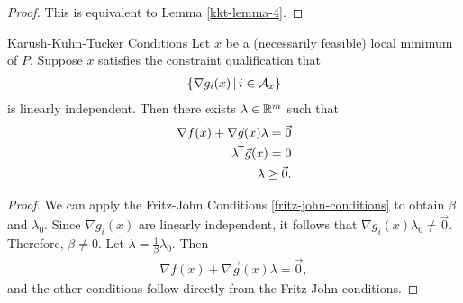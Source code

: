 \begin{proof}
    This is equivalent to Lemma \ref{kkt-lemma-4}.
\end{proof}

\begin{thm}{Karush-Kuhn-Tucker Conditions}\label{kkt-conditions}\proofbreak
    Let $x$ be a (necessarily feasible) local minimum of $P$. Suppose $x$ satisfies the constraint qualification that
    \begin{align}
        \left\{\nabla g_i(x) \,\middle|\, i \in \mathcal{A}_x\right\}
    \end{align}
    is linearly independent. Then there exists $\lambda \in \mathbb{R}^m$ such that
    \begin{align*}
        \nabla f(x) + \nabla \vec{g}(x)\lambda = \vec{0} \\
        {\lambda}^{\mkern-1.5mu\mathsf{T}}\vec{g}(x) = 0 \\
        \lambda \geq \vec{0}.
    \end{align*}
\end{thm}

\begin{proof}
    We can apply the Fritz-John Conditions \ref{fritz-john-conditions} to obtain $\beta$ and $\lambda_0$. Since $\nabla g_i(x)$ are linearly independent, it follows that $\nabla g_i(x)\lambda_0 \neq \vec{0}$. Therefore, $\beta \neq 0$. Let $\lambda = \frac{1}{\beta}\lambda_0$. Then
    \begin{align*}
        \nabla f(x) + \nabla \vec{g}(x)\lambda = \vec{0},
    \end{align*}
    and the other conditions follow directly from the Fritz-John conditions.
\end{proof}

